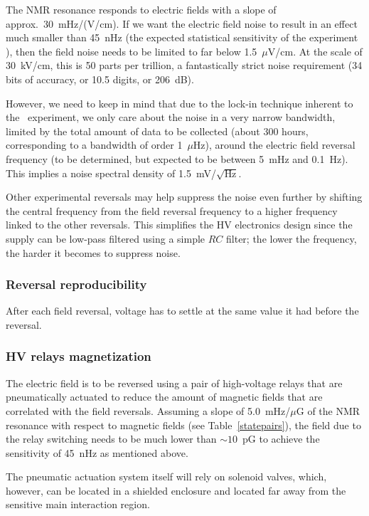 The \gls{NMR} resonance responds to electric fields with a slope of approx.\
30~mHz/(V/cm). If we want the electric field noise to result in an effect much
smaller than 45~nHz (the expected statistical sensitivity of the experiment
\cite[sect~3.1]{grasdijk2021centrex}), then the field noise needs to be limited
to far below 1.5~$\mu$V/cm. At the scale of 30~kV/cm, this is 50 parts per
trillion, a fantastically strict noise requirement (34 bits of accuracy, or 10.5
digits, or 206~dB).

However, we need to keep in mind that due to the lock-in technique inherent to
the \CENTREX\ experiment, we only care about the noise in a very narrow
bandwidth, limited by the total amount of data to be collected (about 300 hours,
corresponding to a bandwidth of order 1~$\mu$Hz), around the electric field
reversal frequency (to be determined, but expected to be between 5~mHz and
0.1~Hz). This implies a noise spectral density of 1.5~mV/$\sqrt{\text{Hz}}$.

Other experimental reversals may help suppress the noise even further by
shifting the central frequency from the field reversal frequency to a higher
frequency linked to the other reversals. This simplifies the HV electronics
design since the supply can be low-pass filtered using a simple $RC$ filter; the
lower the frequency, the harder it becomes to suppress noise.

\subsubsection{Reversal reproducibility}

After each field reversal, voltage has to settle at the same value it had before
the reversal.

\subsubsection{HV relays magnetization}

The electric field is to be reversed using a pair of high-voltage relays that
are pneumatically actuated to reduce the amount of magnetic fields that are
correlated with the field reversals. Assuming a slope of 5.0~mHz/$\mu$G of the
\gls{NMR} resonance with respect to magnetic fields (see
Table~\ref{statepairs}), the field due to the relay switching needs to be much
lower than $\sim10$~pG to achieve the sensitivity of 45~nHz as mentioned above.

The pneumatic actuation system itself will rely on solenoid valves, which,
however, can be located in a shielded enclosure and located far away from the
sensitive main interaction region.


